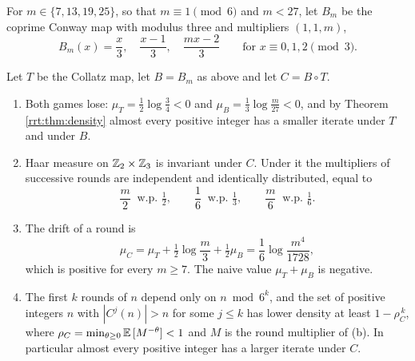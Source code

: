 For $m\in\{7,13,19,25\}$, so that $m\equiv 1 \pmod 6$ and $m<27$, let $B_m$ be the coprime Conway map with modulus three and multipliers $(1,1,m)$,
\[
B_m(x)=\frac{x}{3},\quad \frac{x-1}{3},\quad \frac{m x-2}{3}\qquad\text{for } x\equiv 0,1,2 \pmod 3 .
\]

\begin{theorem}\label{rrt:thm:resonance}
Let $T$ be the Collatz map, let $B=B_m$ as above and let $C=B\circ T$.
\begin{enumerate}
\item[(a)] Both games lose: $\mu_T=\tfrac12\log\tfrac34<0$ and $\mu_B=\tfrac13\log\tfrac{m}{27}<0$, and by Theorem \ref{rrt:thm:density} almost every positive integer has a smaller iterate under $T$ and under $B$.
\item[(b)] Haar measure on $\mathbb{Z}_2\times\mathbb{Z}_3$ is invariant under $C$. Under it the multipliers of successive rounds are independent and identically distributed, equal to
\[
\frac{m}{2}\ \text{ w.p. } \tfrac12,\qquad \frac16\ \text{ w.p. } \tfrac13,\qquad \frac{m}{6}\ \text{ w.p. } \tfrac16 .
\]
\item[(c)] The drift of a round is
\[
\mu_C=\mu_T+\tfrac12\log\frac{m}{3}+\tfrac12\mu_B=\frac16\log\frac{m^4}{1728},
\]
which is positive for every $m\ge 7$. The naive value $\mu_T+\mu_B$ is negative.
\item[(d)] The first $k$ rounds of $n$ depend only on $n \bmod 6^k$, and the set of positive integers $n$ with $|C^j(n)|>n$ for some $j\le k$ has lower density at least $1-\rho_C^{\,k}$, where $\rho_C=\min_{\theta\ge 0}\mathbb{E}\,[M^{-\theta}]<1$ and $M$ is the round multiplier of (b). In particular almost every positive integer has a larger iterate under $C$.
\end{enumerate}
\end{theorem}

